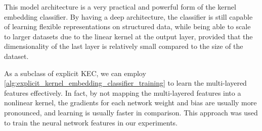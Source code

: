 \documentclass{article}
\numberwithin{equation}{section}
\numberwithin{table}{section}
\numberwithin{algorithm}{section}
\begin{document}
		This model architecture is a very practical and powerful form of the kernel embedding classifier. By having a deep architecture, the classifier is still capable of learning flexible representations on structured data, while being able to scale to larger datasets due to the linear kernel at the output layer, provided that the dimensionality of the last layer is relatively small compared to the size of the dataset.
		
		As a subclass of explicit KEC, we can employ \cref{alg:explicit_kernel_embedding_classifier_training} to learn the multi-layered features effectively. In fact, by not mapping the multi-layered features into a nonlinear kernel, the gradients for each network weight and bias are usually more pronounced, and learning is usually faster in comparison. This approach was used to train the neural network features in our experiments.

\newpage


\end{document}
